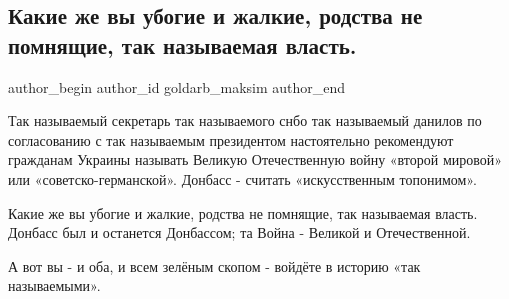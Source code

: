  
 
 
 
 
 
\subsection{Какие же вы убогие и жалкие, родства не помнящие, так называемая власть.}
\label{sec:21_10_2021.fb.goldarb_maksim.1.vlast_ubogaja}
 
\ifcmt
 author_begin
   author_id goldarb_maksim
 author_end
\fi

Так называемый секретарь так называемого снбо так называемый данилов по
согласованию с так называемым президентом настоятельно рекомендуют гражданам
Украины называть Великую Отечественную войну «второй мировой» или
«советско-германской». Донбасс - считать «искусственным топонимом».

Какие же вы убогие и жалкие, родства не помнящие, так называемая власть.
Донбасс был и останется Донбассом; та Война - Великой и Отечественной. 

А вот вы - и оба, и всем зелёным скопом - войдёте в историю «так называемыми».

